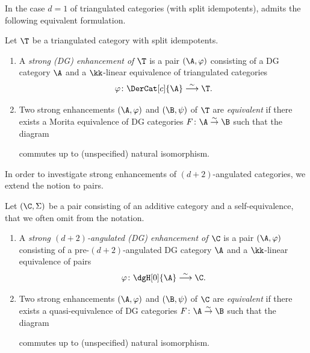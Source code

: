 \documentclass[a4paper]{amsart}
\begin{document}
In the case $d=1$ of triangulated categories (with split idempotents),  admits the
following equivalent formulation.

\begin{definition}
  \label{def:strong_triangulated}
  Let $\T$ be a triangulated category with split idempotents.
  \begin{enumerate}
  \item A \emph{strong (DG) enhancement of $\T$}
    is a pair $(\A,\varphi)$ consisting of a DG category $\A$ and a 
    $\kk$-linear equivalence of triangulated categories
    \[
      \varphi\colon\DerCat[c]{\A}\stackrel{\sim}{\longrightarrow}\T.
    \]
  \item\label{it:strong_equivalence_triangulated}  Two strong enhancements $(\A,\varphi)$ and $(\B,\psi)$ of $\T$ are
    \emph{equivalent} if there exists a Morita equivalence of DG categories
    $F\colon\A\stackrel{\sim}{\to}\B$ such that the diagram
    \begin{center}
    \end{center}
    commutes up to (unspecified) natural isomorphism.
  \end{enumerate}
\end{definition}

In order to investigate strong enhancements of $(d+2)$-angulated categories, we extend the notion to pairs.

\begin{definition}
  \label{def:strong_pairs}
  Let $(\C,\Sigma)$ be a pair consisting of an additive category and a
  self-equivalence, that we often omit from the notation. 
  \begin{enumerate}
  \item A \emph{strong $(d+2)$-angulated (DG) enhancement of $\C$}
    is a pair $(\A,\varphi)$ consisting of a pre-$(d+2)$-angulated DG category $\A$ and a 
    $\kk$-linear equivalence of pairs
    \[
      \varphi\colon\dgH[0]{\A}\stackrel{\sim}{\longrightarrow}\C.
    \]
  \item\label{it:strong_equivalence_pairs}  Two strong enhancements $(\A,\varphi)$ and $(\B,\psi)$ of $\C$ are
    \emph{equivalent} if there exists a quasi-equivalence of DG categories
    $F\colon\A\stackrel{\sim}{\to}\B$ such that the diagram
    \begin{center}
    \end{center}
    commutes up to (unspecified) natural isomorphism.
  \end{enumerate}
\end{definition}
\end{document}
